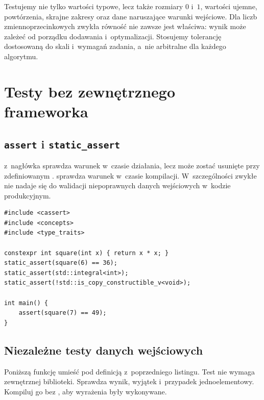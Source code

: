 Testujemy nie tylko wartości typowe, lecz także rozmiary $0$ i~$1$,
wartości ujemne, powtórzenia, skrajne zakresy oraz dane naruszające
warunki wejściowe. Dla liczb zmiennoprzecinkowych zwykła równość
 nie zawsze jest właściwa: wynik może zależeć od porządku
dodawania i~optymalizacji. Stosujemy tolerancję dostosowaną do skali
i~wymagań zadania, a~nie arbitralne  dla każdego algorytmu.

\section{Testy bez zewnętrznego frameworka}

\subsection{\texttt{assert} i \texttt{static\_assert}}

 z~nagłówka  sprawdza warunek
w~czasie działania, lecz może zostać usunięte przy zdefiniowanym
.  sprawdza warunek w~czasie
kompilacji. W~szczególności zwykłe  nie nadaje się do
walidacji niepoprawnych danych wejściowych w~kodzie produkcyjnym.

\begin{lstlisting}[caption={Asercja kompilacyjna i kontrola zachowania funkcji.}]
#include <cassert>
#include <concepts>
#include <type_traits>

constexpr int square(int x) { return x * x; }
static_assert(square(6) == 36);
static_assert(std::integral<int>);
static_assert(!std::is_copy_constructible_v<void>);

int main() {
    assert(square(7) == 49);
}
\end{lstlisting}


\subsection{Niezależne testy danych wejściowych}

Poniższą funkcję  umieść pod definicją 
z~poprzedniego listingu. Test nie wymaga zewnętrznej biblioteki.
Sprawdza wynik, wyjątek i~przypadek jednoelementowy. Kompiluj go
bez , aby wyrażenia  były wykonywane.

